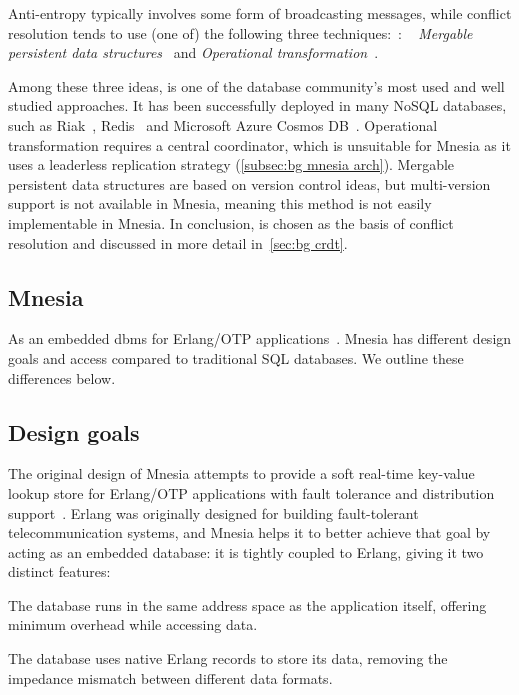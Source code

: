 Anti-entropy typically involves some form of broadcasting messages, while conflict
resolution tends to use (one of) the following three techniques:~\cite{kleppmann2017DDIA}:
\emph{}~\cite{shapiro2011CRDT,preguica2018CRDT}
\emph{Mergable persistent data structures}~\cite{farinier2015mergable} and
\emph{Operational transformation}~\cite{ellis1989ot}. 

Among these three ideas,  is one of the 
database community's most used and well studied approaches. It has been
successfully deployed in many NoSQL databases, such as 
Riak~\cite{klophaus2010Riak}, Redis~\cite{redis2022rediscrdt} and Microsoft Azure 
Cosmos DB~\cite{shukla2018CosmosDB}. Operational transformation requires a central 
coordinator, which
is unsuitable for Mnesia as it uses a leaderless replication strategy (\cref{subsec:bg mnesia arch}). 
Mergable persistent data structures are based on version
control ideas, but multi-version support is not available in Mnesia,
meaning this method is not easily implementable in Mnesia. In conclusion,
 is chosen as the basis of conflict resolution and discussed in
more detail in~\cref{sec:bg crdt}.


\subsection{Mnesia} \label{sec:bg mnesia}

As an embedded \acrshort{dbms} for Erlang/OTP 
applications~\cite{mattsson1998mnesia,mattsson1999mnesiainternal}.
Mnesia has different design goals and access  compared to
traditional SQL databases. We outline these differences below.

\subsection{Design goals} \label{subsec:bg mnesia design goal}

The original design of Mnesia attempts to provide a soft real-time key-value
lookup store for Erlang/OTP applications with fault tolerance and distribution
support~\cite{ericssonab2023mnesiaguide}.
Erlang was originally designed for building fault-tolerant telecommunication systems,
and Mnesia helps it to better achieve that goal by acting as an embedded database: 
it is tightly coupled to Erlang, giving it two distinct features:
\begin{enumerate*}[(a)]
  \item The database runs in the same address space as the application itself,
  offering minimum overhead while accessing data.
  \item The database uses native Erlang records to store its data,
  removing the impedance mismatch between different data formats.
\end{enumerate*}

